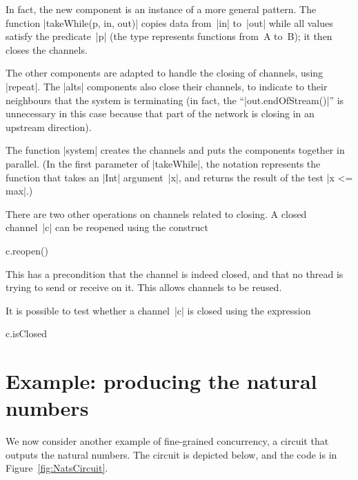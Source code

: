 
In fact, the new component is an instance of a more general pattern.  The
function |takeWhile(p, in, out)| copies data from~|in| to~|out| while all
values satisfy the predicate~|p| (the type \protect{}
  represents functions from~{\scalashape A} to~{\scalashape B}); it then
closes the channels.  

The other components are adapted to handle the closing of channels, using
|repeat|.  The |alts| components also close their channels, to indicate to
their neighbours that the system is terminating (in fact, the
``|out.endOfStream()|'' is unnecessary in this case because that part of the
network is closing in an upstream direction). 

The function |system| creates the channels and puts the components together in
parallel.  (In the first parameter of |takeWhile|, the notation  represents the function that takes an |Int| argument~|x|,
and returns the result of the test |x <= max|.)

\medskip

There are two other operations on channels related to closing. 
A closed channel~|c| can be reopened using the construct
\begin{scala}
  c.reopen()
\end{scala}
%
This has a precondition that the channel is indeed closed, and that no thread
is trying to send or receive on it.  This allows channels to be reused.

It is possible to test whether a channel~|c| is closed using the expression
%
\begin{scala}
  c.isClosed
\end{scala}



\section{Example: producing the natural numbers}

We now consider another example of fine-grained concurrency, a circuit that
outputs the natural numbers.  The circuit is depicted below, and the code is
in Figure~\ref{fig:NatsCircuit}. 

\begin{center}
\end{center}

